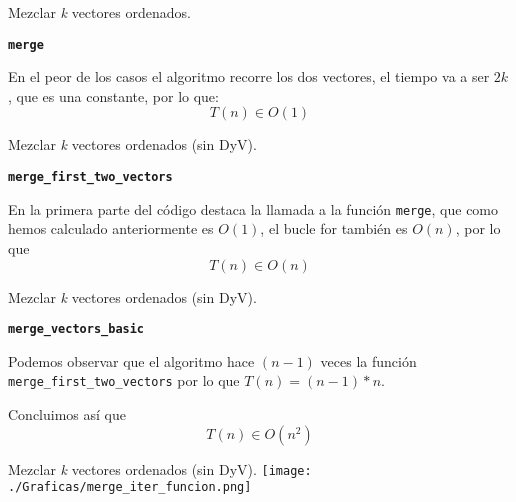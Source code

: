 \documentclass[10pt, xcolor=table]{beamer}
\begin{document}
\begin{frame}[fragile]{Mezclar \textit{k} vectores ordenados. }
\begin{center}
	\textbf{\large{\texttt{merge}}}
\end{center}

En el peor de los casos el algoritmo recorre los dos vectores, el tiempo va a ser $2k$, que es una constante, por lo que: $$T(n) \in O(1)$$
\end{frame}

\begin{frame}[fragile]{Mezclar \textit{k} vectores ordenados (sin DyV). }

\begin{center}
	\textbf{\large{\texttt{merge\_first\_two\_vectors}}}
\end{center}

En la primera parte del código destaca la llamada a la función \texttt{merge}, que como hemos calculado anteriormente es $O(1)$, el bucle for también es $O(n)$, por lo que 
$$T(n) \in O(n)$$

\end{frame}

\begin{frame}[fragile]{Mezclar \textit{k} vectores ordenados (sin DyV). }
\begin{center}
	\textbf{\large{\texttt{merge\_vectors\_basic}}}
\end{center}

Podemos observar que el algoritmo hace $(n-1)$ veces la función \texttt{merge\_first\_two\_vectors} por lo que $T(n) = (n-1)*n$. 

Concluimos así que
$$T(n) \in O(n^2)$$

\end{frame}



\begin{frame}[fragile]{Mezclar \textit{k} vectores ordenados (sin DyV). }
\texttt{[image: ./Graficas/merge\_iter\_funcion.png]}
\end{frame}
\end{document}
